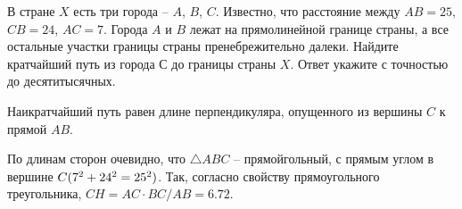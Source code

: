 
В стране $X$ есть три города -- $A$, $B$, $C$. Известно, что расстояние между $AB=25$, $CB=24$, $AC=7$. Города $A$ и $B$ лежат на прямолинейной границе страны, а все остальные участки границы страны пренебрежительно далеки. Найдите кратчайший путь из города $С$ до границы страны $X$. Ответ укажите с точностью до десятитысячных.

\solutionSection

Наикратчайший путь равен длине перпендикуляра, опущенного из вершины $C$ к прямой $AB$. 


По длинам сторон очевидно, что $\triangle ABC$ -- прямойгольный, с прямым углом в вершине $C\space (7^2 + 24^2 = 25^2)$. Так, согласно свойству прямоугольного треугольника, $CH = AC\cdot BC / AB = 6.72$.

